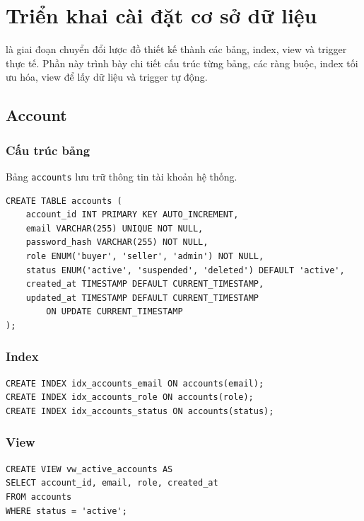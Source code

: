 \chapter{Triển khai cài đặt cơ sở dữ liệu}

 là giai đoạn chuyển đổi lược đồ thiết kế thành các bảng, index, view và trigger thực tế. Phần này trình bày chi tiết cấu trúc từng bảng, các ràng buộc, index tối ưu hóa, view để lấy dữ liệu và trigger tự động.

\section{Account}

\subsection{Cấu trúc bảng}

Bảng \texttt{accounts} lưu trữ thông tin tài khoản hệ thống.

\begin{verbatim}
CREATE TABLE accounts (
    account_id INT PRIMARY KEY AUTO_INCREMENT,
    email VARCHAR(255) UNIQUE NOT NULL,
    password_hash VARCHAR(255) NOT NULL,
    role ENUM('buyer', 'seller', 'admin') NOT NULL,
    status ENUM('active', 'suspended', 'deleted') DEFAULT 'active',
    created_at TIMESTAMP DEFAULT CURRENT_TIMESTAMP,
    updated_at TIMESTAMP DEFAULT CURRENT_TIMESTAMP 
        ON UPDATE CURRENT_TIMESTAMP
);
\end{verbatim}

\subsection{Index}

\begin{verbatim}
CREATE INDEX idx_accounts_email ON accounts(email);
CREATE INDEX idx_accounts_role ON accounts(role);
CREATE INDEX idx_accounts_status ON accounts(status);
\end{verbatim}

\subsection{View}

\begin{verbatim}
CREATE VIEW vw_active_accounts AS
SELECT account_id, email, role, created_at
FROM accounts
WHERE status = 'active';
\end{verbatim}


